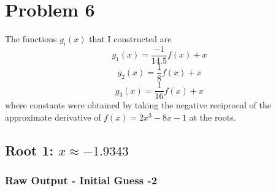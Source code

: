 \documentclass[11pt]{article} %
\begin{document}
\section*{Problem 6}
The functions $g_i(x)$ that I constructed are 
$$g_1(x) = \frac{-1}{14.5}f(x) + x$$
$$g_2(x) = \frac{1}{8}f(x) + x$$
$$g_3(x) = \frac{1}{16}f(x) + x$$
where constants were obtained by taking the negative reciprocal of the approximate derivative of $f(x) = 2x^3 - 8x -1$ at
the roots.
\subsection*{Root 1: $x  \approx -1.9343$ }
\subsubsection*{Raw Output - Initial Guess -2}
 
\end{document}
